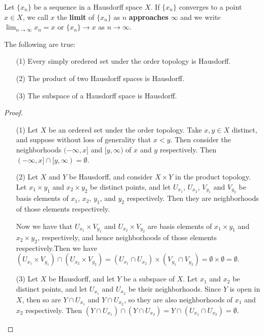 \begin{definition}
    Let $\{x_n\}$ be a sequence in a Hausdorff space  $X$. If  $\{x_n\}$
    converges to a point $x \in X$, we call  $x$ the \textbf{limit} of
    $\{x_n\}$ as $n$  \textbf{approaches} $\infty$ and we write $\lim_{n
    \rightarrow \infty}{x_n}=x$ or $\{x_n\} \rightarrow x$ as $n \rightarrow
    \infty$.
\end{definition}

\begin{theorem}\label{1.6.11}
    The following are true:
        \begin{enumerate}
            \item[(1)] Every simply oredered set under the order topology is
                Hausdorff.

            \item[(2)] The product of two Hausdorff spaces is Hausdorff.

            \item[(3)] The subspace of a Hausdorff space is Hausdorff.
        \end{enumerate}
\end{theorem}
\begin{proof}
    \begin{enumerate}
        \item[(1)] Let $X$ be an ordered set under the order topology. Take  $x,y \in
            X$ distinct, and suppose without loss of generality that $x<y$. Then
            consider the neighborhoods  $(-\infty,x]$ and  $[y,\infty)$ of  $x$
            and  $y$ respectively. Then  $(-\infty,x] \cap
            [y,\infty)=\emptyset$.

        \item[(2)] Let $X$ and  $Y$ be Hausdorff, and consider  $X \times Y$ in the
            product topology. Let  $ x_1 \times y_1$ and $ x_2 \times y_2$ be
            distinct points, and let $U_{x_1}$, $U_{x_2}$, $V_{y_1}$ and
            $V_{y_2}$ be basis elements of $ x_1$, $ x_2$, $y_1$, and $y_2$
            respectively. Then they are neighborhoods of those elements
            respectively.

            Now we have that $U_{x_1} \times V_{y_1}$ and $U_{x_2} \times
            V_{y_2}$ are basis elements of $ x_1 \times y_1$ and $ x_2 \times
            y_2$, respectively, and hence neighborhoods of those elements
            respectively.Then we have $(U_{x_1} \times V_{y_1}) \cap (U_{x_2} \times
            V_{y_2})=(U_{x_1} \cap U_{x_2}) \times (V_{y_1} \cap V_{y_2}) = \emptyset
            \times \emptyset =\emptyset$.

        \item[(3)] Let $X$ be Hausdorff, and let  $Y$ be a subspace of  $X$. Let  $x_1$
            and $x_2$ be distinct points, and let  $U_{x_1}$ and $U_{x_2}$ be
            their neighborhoods. Since $Y$ is open in  $X$, then so are  $Y \cap
            U_{x_1}$ and $Y \cap U_{x_2}$, so they are also neighborhoods of $
            x_1$ and $ x_2$ respectively. Then $(Y \cap U_{x_1}) \cap
            (Y \cap U_{x_2})=Y \cap (U_{x_1} \cap
            U_{x_2})=\emptyset$.
    \end{enumerate}
\end{proof}
